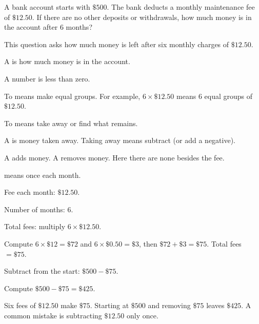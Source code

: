 
A bank account starts with $\$500$. The bank deducts a monthly maintenance fee of $\$12.50$. If there are no other deposits or withdrawals, how much money is in the account after 6 months?


This question asks how much money is left after six monthly charges of $\$12.50$.

\begin{words}
  \item A is how much money is in the account.
  \item A number is less than zero.
  \item To means make equal groups. For example, $6 \times \$12.50$ means 6 equal groups of $\$12.50$.
  \item To means take away or find what remains.
  \item A is money taken away. Taking away means subtract (or add a negative).
  \item A adds money. A removes money. Here there are none besides the fee.
  \item {}means once each month.
\end{words}

\begin{steps}
  \item Fee each month: $\$12.50$.
  \item Number of months: 6.
  \item Total fees: multiply $6 \times \$12.50$.
  \item Compute $6 \times \$12 = \$72$ and $6 \times \$0.50 = \$3$, then $\$72 + \$3 = \$75$. Total fees $= \$75$.
  \item Subtract from the start: $\$500 - \$75$.
  \item Compute $\$500 - \$75 = \$425$.
\end{steps}


Six fees of $\$12.50$ make $\$75$. Starting at $\$500$ and removing $\$75$ leaves $\$425$. A common mistake is subtracting $\$12.50$ only once.


